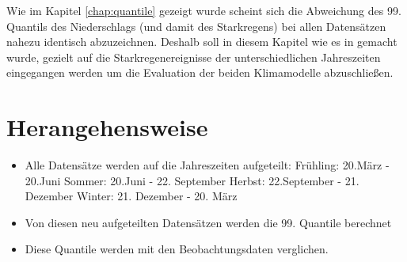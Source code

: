 Wie im Kapitel \ref{chap:quantile} gezeigt wurde scheint sich die Abweichung des 99. Quantils des Niederschlags (und damit des Starkregens) bei allen Datensätzen nahezu identisch abzuzeichnen. Deshalb soll in diesem Kapitel wie es in \cite{biasMaraun} gemacht wurde, gezielt auf die Starkregenereignisse der unterschiedlichen Jahreszeiten eingegangen werden um die Evaluation der beiden Klimamodelle abzuschließen.
\section{Herangehensweise}
\begin{itemize}
\item Alle Datensätze werden auf die Jahreszeiten aufgeteilt:
	\subitem Frühling: 20.März - 20.Juni
	\subitem Sommer: 20.Juni - 22. September
	\subitem Herbst: 22.September - 21. Dezember
	\subitem Winter: 21. Dezember - 20. März
\item Von diesen neu aufgeteilten Datensätzen werden die 99. Quantile berechnet
\item Diese Quantile werden mit den Beobachtungsdaten verglichen.
\end{itemize}

